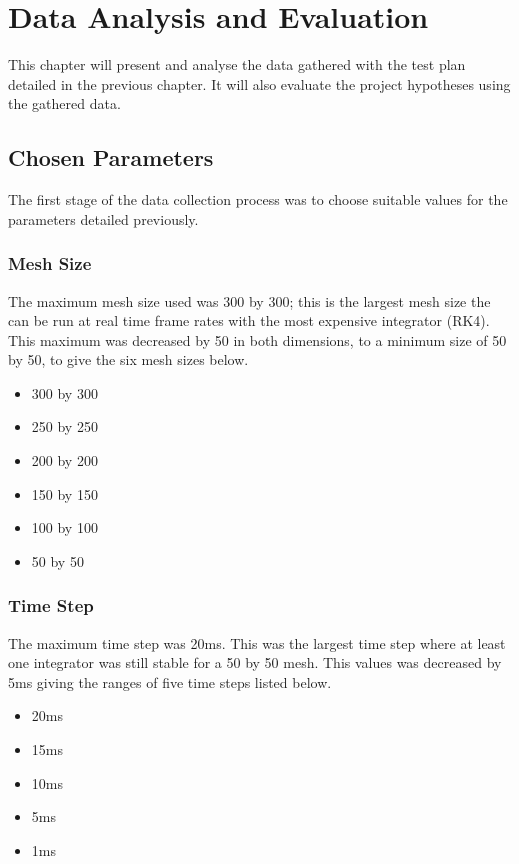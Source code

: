 \chapter{Data Analysis and Evaluation}
\label{sec:eval}

This chapter will present and analyse the data gathered with the test plan detailed in the previous chapter. It will also evaluate the project hypotheses using the gathered data.

\section{Chosen Parameters}
The first stage of the data collection process was to choose suitable values for the parameters detailed previously.

\subsection{Mesh Size}
The maximum mesh size used was 300 by 300; this is the largest mesh size the can be run at real time frame rates with the most expensive integrator (RK4). This maximum was decreased by 50 in both dimensions, to a minimum size of 50 by 50, to give the six mesh sizes below.
\begin{itemize}
\item{300 by 300}
\item{250 by 250}
\item{200 by 200}
\item{150 by 150}
\item{100 by 100}
\item{50 by 50}
\end{itemize}

\subsection{Time Step}
The maximum time step was 20ms. This was the largest time step where at least one integrator was still stable for a 50 by 50 mesh. This values was decreased by 5ms giving the ranges of five time steps listed below.
\begin{itemize}
\item{20ms}
\item{15ms}
\item{10ms}
\item{5ms}
\item{1ms}
\end{itemize}

